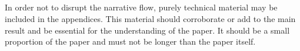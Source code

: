 \documentclass[lineno]{JFM-FLM_Au}
\begin{document}
\begin{appen}

\section{}\label{appA}
In order not to disrupt the narrative flow, purely technical material may be included in the appendices. This material should corroborate or add to the main result and be essential for the understanding of the paper. It should be a small proportion of the paper and must not be longer than the paper itself.

\end{appen}\clearpage


%
%








\end{document}
